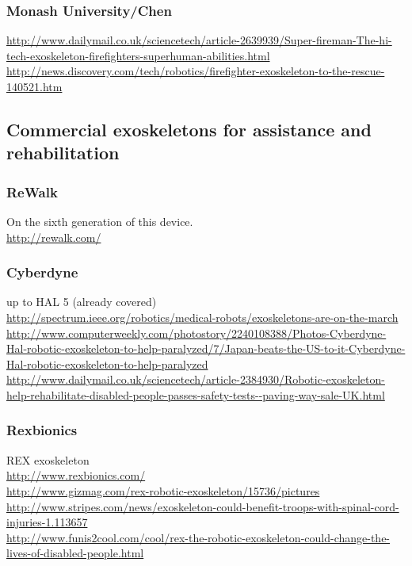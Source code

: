 \subsubsection{Monash University/Chen}

\noindent
\url{http://www.dailymail.co.uk/sciencetech/article-2639939/Super-fireman-The-hi-tech-exoskeleton-firefighters-superhuman-abilities.html}\\
\url{http://news.discovery.com/tech/robotics/firefighter-exoskeleton-to-the-rescue-140521.htm}\\


\subsection{Commercial exoskeletons for assistance and rehabilitation}

\subsubsection{ReWalk}

\noindent
On the sixth generation of this device.\\
\url{http://rewalk.com/}\\

\subsubsection{Cyberdyne}

\noindent
up to HAL 5 (already covered)\\
\url{http://spectrum.ieee.org/robotics/medical-robots/exoskeletons-are-on-the-march}\\
\url{http://www.computerweekly.com/photostory/2240108388/Photos-Cyberdyne-Hal-robotic-exoskeleton-to-help-paralyzed/7/Japan-beats-the-US-to-it-Cyberdyne-Hal-robotic-exoskeleton-to-help-paralyzed}\\
\url{http://www.dailymail.co.uk/sciencetech/article-2384930/Robotic-exoskeleton-help-rehabilitate-disabled-people-passes-safety-tests--paving-way-sale-UK.html}\\

\subsubsection{Rexbionics}

\noindent
REX exoskeleton\\
\url{http://www.rexbionics.com/}\\
\url{http://www.gizmag.com/rex-robotic-exoskeleton/15736/pictures}\\
\url{http://www.stripes.com/news/exoskeleton-could-benefit-troops-with-spinal-cord-injuries-1.113657}\\
\url{http://www.funis2cool.com/cool/rex-the-robotic-exoskeleton-could-change-the-lives-of-disabled-people.html}\\

